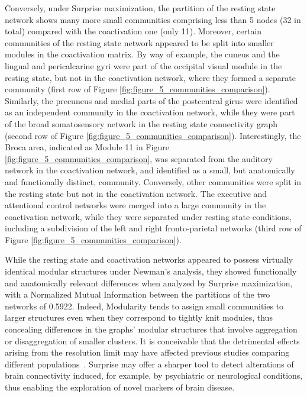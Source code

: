 Conversely, under Surprise maximization, the partition of the resting state network shows many more small communities comprising less than 5 nodes (32 in total) compared with the coactivation one (only 11). Moreover, certain communities of the resting state network appeared to be split into smaller modules in the coactivation matrix. 
By way of example, the cuneus and the lingual and pericalcarine gyri were part of the occipital visual module in the resting state, but not in the coactivation network, where they formed a separate community (first row of Figure \ref{fig:figure_5_communities_comparison}).
Similarly, the precuneus and medial parts of the postcentral girus were identified as an independent community in the coactivation network, while they were part of the broad somatosensory network in the resting state connectivity graph~\cite{rubinov2011} (second row of Figure \ref{fig:figure_5_communities_comparison}).
Interestingly, the Broca area, indicated as Module 11 in Figure \ref{fig:figure_5_communities_comparison}, was separated from the auditory network in the coactivation network, and identified as a small, but anatomically and functionally distinct, community.
Conversely, other communities were split in the resting state but not in the coactivation network. The executive and attentional control networks were merged into a large community in the coactivation network, while they were separated under resting state conditions, including a subdivision of the left and right fronto-parietal networks (third row of Figure \ref{fig:figure_5_communities_comparison}).

While the resting state and coactivation networks appeared to possess virtually identical modular structures under Newman's analysis, they showed functionally and anatomically relevant differences when analyzed by Surprise maximization, with a Normalized Mutual Information between the partitions of the two networks of 0.5922. Indeed, Modularity tends to assign small communities to larger structures even when they correspond to tightly knit modules, thus concealing differences in the graphs' modular structures that involve aggregation or disaggregation of smaller clusters. It is conceivable that the detrimental effects arising from the resolution limit may have affected previous studies comparing different populations~\cite{meunier2010}.
Surprise may offer a sharper tool to detect alterations of brain connectivity induced, for example, by psychiatric or neurological conditions, thus enabling the exploration of novel markers of brain disease.

